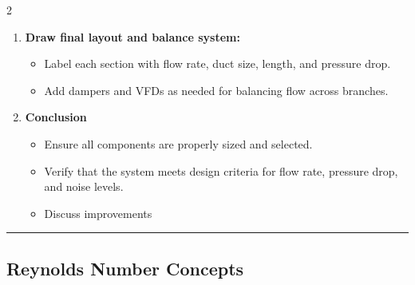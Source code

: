 \begin{multicols*}{2}
\begin{enumerate}

        \item \textbf{Draw final layout and balance system:}
              \begin{itemize}
                  \item Label each section with flow rate, duct size, length, and pressure drop.
                  \item Add dampers and VFDs as needed for balancing flow across branches.
              \end{itemize}
        \item \textbf{Conclusion}
              \begin{itemize}
                  \item Ensure all components are properly sized and selected.
                  \item Verify that the system meets design criteria for flow rate, pressure drop, and noise levels.
                  \item Discuss improvements
              \end{itemize}
    \end{enumerate}

    \rule{\linewidth}{0.4pt}

    \subsection{Reynolds Number Concepts}

\end{multicols*}
